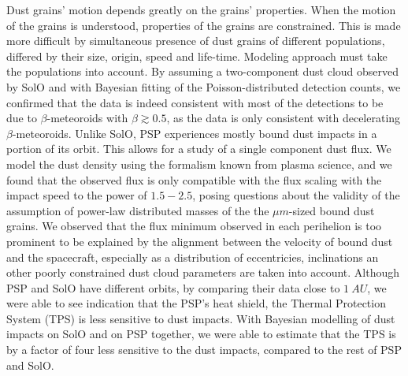 Dust grains' motion depends greatly on the grains' properties. When the motion of the grains is understood, properties of the grains are constrained. This is made more difficult by simultaneous presence of dust grains of different populations, differed by their size, origin, speed and life-time. Modeling approach must take the populations into account. By assuming a two-component dust cloud observed by SolO and with Bayesian fitting of the Poisson-distributed detection counts, we confirmed that the data is indeed consistent with most of the detections to be due to $\beta$-meteoroids with $\beta\gtrsim 0.5$, as the data is only consistent with decelerating $\beta$-meteoroids. Unlike SolO, PSP experiences mostly bound dust impacts in a portion of its orbit. This allows for a study of a single component dust flux. We model the dust density using the formalism known from plasma science, and we found that the observed flux is only compatible with the flux scaling with the impact speed to the power of $1.5 - 2.5$, posing questions about the validity of the assumption of power-law distributed masses of the the $\mu m$-sized bound dust grains. We observed that the flux minimum observed in each perihelion is too prominent to be explained by the alignment between the velocity of bound dust and the spacecraft, especially as a distribution of eccentricies, inclinations an other poorly constrained dust cloud parameters are taken into account. Although PSP and SolO have different orbits, by comparing their data close to $\SI{1}{AU}$, we were able to see indication that the PSP's heat shield, the Thermal Protection System (TPS) is less sensitive to dust impacts. With Bayesian modelling of dust impacts on SolO and on PSP together, we were able to estimate that the TPS is by a factor of four less sensitive to the dust impacts, compared to the rest of PSP and SolO. 